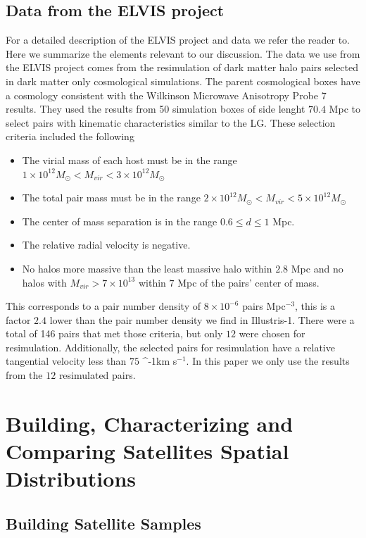 \documentclass[a4paper,fleqn,usenatbib]{mnras}
\newcommand{\kms}{\ifmmode\mathrm{km\ s}^{-1}\else km s$^{-1}$\fi}
\begin{document}
\subsection{Data from the ELVIS project}
\label{sim:ELVIS}

For a detailed description of the ELVIS project and data we refer the
reader to. 
Here we summarize the elements relevant to our discussion.
The data we use from the ELVIS project comes from the resimulation of
dark matter halo pairs selected in dark matter only cosmological simulations.
The parent cosmological boxes have a cosmology consistent with the
Wilkinson Microwave Anisotropy Probe 7 results.
They used the results from 50 simulation boxes of side lenght $70.4$
Mpc to select pairs with kinematic characteristics similar to the LG.
These selection criteria included the following
\begin{itemize}
\item The virial mass of each host must be in the range 
$1\times
  10^{12} M_{\odot}< M_{vir}<3\times 10^{12}M_{\odot}$ 
\item The total pair mass must be in the range
$2\times
  10^{12} M_{\odot}< M_{vir}<5\times 10^{12}M_{\odot}$ 
\item The center of mass separation is in the range $0.6\leq d\leq1$
  Mpc.
\item The relative radial velocity is negative.
\item No halos more massive than the least massive halo within $2.8$
  Mpc and no halos with $M_{vir}>7\times 10^{13}$ within $7$ Mpc of
  the pairs' center of mass.
\end{itemize} 

This corresponds to a pair number density of $8 \times10^{-6}$ pairs
Mpc$^{-3}$, this is a factor $2.4$ lower than the pair number density
we find in Illustris-1.
There were a total of 146 pairs that met those criteria, but only $12$
were chosen for resimulation. 
Additionally, the selected pairs for resimulation have a relative
tangential velocity less than $75$ \kms. 
In this paper we only use the results from the $12$ resimulated pairs.


\section{Building, Characterizing and Comparing Satellites Spatial Distributions}
\label{sec:SpatialMeasurements}


\subsection{Building Satellite Samples}
\end{document}
